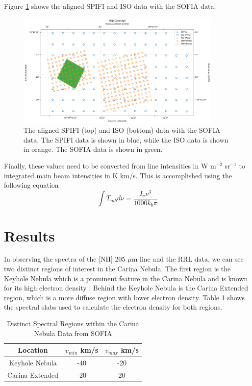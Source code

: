 Figure \ref{carina/fig:aligned_fits} shows the aligned SPIFI and ISO data with the SOFIA data.
\begin{figure}
    \centering
    \includegraphics[width=0.9\textwidth]{figs/carina/fits_coverage.png}
    \caption[Aligned SPIFI and ISO Data with SOFIA Data]{
        The aligned SPIFI (top) and ISO (bottom) data with the SOFIA data.
        The SPIFI data is shown in blue, while the ISO data is shown in orange.
        The SOFIA data is shown in green.
        }
    \label{carina/fig:aligned_fits}
\end{figure}

Finally, these values need to be converted from line intensities in W m$^{-2}$ sr$^{-1}$ to integrated main beam intensities in K km/s.
This is accomplished using the following equation \cite{oberst2011205}
\begin{equation}
    \int{T_{mb} d\nu} = \frac{I_\nu \nu^3}{1000 k_b \pi}
\end{equation}

\section{Results}
In observing the spectra of the [NII] 205 $\mu$m line and the RRL data, we can see two distinct regions of interest in the Carina Nebula.
The first region is the Keyhole Nebula which is a prominent feature in the Carina Nebula and is known for its high electron density \cite{brooks2000unlocking}.
Behind the Keyhole Nebula is the Carina Extended region, which is a more diffuse region with lower electron density.
Table \ref{carina/tab:slabs} shows the spectral slabs used to calculate the electron density for both regions.

\begin{table}
    \centering
    \begin{tabular}{|c|c|c|}
        \hline
        Location & $v_{min}$ km/s & $v_{max}$ km/s \\
        \hline
        Keyhole Nebula & -40 & -20 \\
        Carina Extended & -20 & 20 \\
        \hline
    \end{tabular}
    \caption{Distinct Spectral Regions within the Carina Nebula Data from SOFIA}
    \label{carina/tab:slabs}
\end{table}

